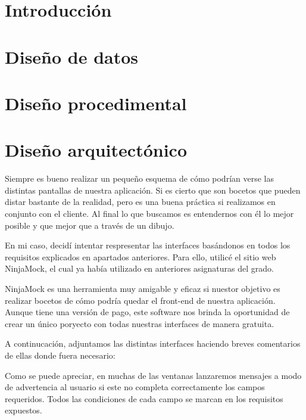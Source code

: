 
\section{Introducción}

\section{Diseño de datos}

\section{Diseño procedimental}

\section{Diseño arquitectónico}

	Siempre es bueno realizar un pequeño esquema de cómo podrían verse las distintas pantallas de nuestra aplicación. Si es cierto que son bocetos que pueden distar bastante de la realidad, pero es una buena práctica si realizamos en conjunto con el cliente. Al final lo que buscamos es entendernos con él lo mejor posible y que mejor que a través de un dibujo.
	
	En mi caso, decidí intentar respresentar las interfaces basándonos en todos los requisitos explicados en apartados anteriores. Para ello, utilicé el sitio web NinjaMock, el cual ya había utilizado en anteriores asignaturas del grado.
	
	NinjaMock es una herramienta muy amigable y eficaz si nuestor objetivo es realizar bocetos de cómo podría quedar el front-end de nuestra aplicación. Aunque tiene una versión de pago, este software nos brinda la oportunidad de crear un único poryecto con todas nuestras interfaces de manera gratuita.
	
	A continucación, adjuntamos las distintas interfaces haciendo breves comentarios de ellas donde fuera necesario:


	Como se puede apreciar, en muchas de las ventanas lanzaremos mensajes a modo de advertencia al usuario si este no completa correctamente los campos requeridos. Todos las condiciones de cada campo se marcan en los requisitos expuestos.
	

